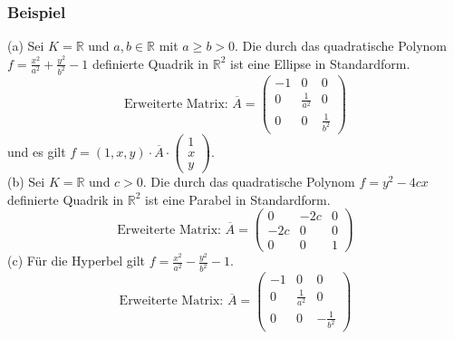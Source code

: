 \documentclass[a4paper]{article}
\begin{document}
\subsubsection{Beispiel}
(a) Sei \(K=\mathbb{R}\) und \(a,b\in\mathbb{R}\) mit \(a\geq b > 0\). Die durch das quadratische Polynom \(f=\frac{x^2}{a^2}+\frac{y^2}{b^2}-1\) definierte Quadrik in \(\mathbb{R}^2\) ist eine Ellipse in Standardform.
$$\text{Erweiterte Matrix: }\overline{A}=\begin{pmatrix}
-1 & 0 & 0\\
0 & \frac{1}{a^2} & 0\\
0 & 0 & \frac{1}{b^2}
\end{pmatrix}$$
und es gilt \(f=(1,x,y)\cdot \overline{A}\cdot \begin{pmatrix}
1\\
x\\
y
\end{pmatrix}\).\\
(b) Sei \(K=\mathbb{R}\) und \(c>0\). Die durch das quadratische Polynom \(f=y^2-4cx\) definierte Quadrik in \(\mathbb{R}^2\) ist eine Parabel in Standardform.
$$\text{Erweiterte Matrix: }\overline{A}=\begin{pmatrix}
0 & -2c & 0\\
-2c & 0 & 0\\
0 & 0 & 1
\end{pmatrix}$$
(c) Für die Hyperbel gilt \(f=\frac{x^2}{a^2}-\frac{y^2}{b^2}-1\).
$$\text{Erweiterte Matrix: }\overline{A}=\begin{pmatrix}
-1 & 0 & 0\\
0 & \frac{1}{a^2} & 0\\
0 & 0 & -\frac{1}{b^2}
\end{pmatrix}$$
\end{document}

